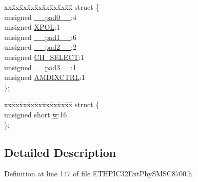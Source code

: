 \begin{DoxyCompactItemize}
\begin{tabbing}
\end{tabbing}\item 
\begin{tabbing}
xx\=xx\=xx\=xx\=xx\=xx\=xx\=xx\=xx\=\kill
struct \{\\
\>unsigned \hyperlink{union_____s_p_e_c_i_a_l_c_t_r_lbits__t_adf71f3d8410c1f1dbbc96680a92c49af}{\_\_pad0\_\_}:4\\
\>unsigned \hyperlink{union_____s_p_e_c_i_a_l_c_t_r_lbits__t_a95295a55abaebd3cb654ddc970a85c7a}{XPOL}:1\\
\>unsigned \hyperlink{union_____s_p_e_c_i_a_l_c_t_r_lbits__t_acaf2d0924a107ec6e8d2e31febaf66f9}{\_\_pad1\_\_}:6\\
\>unsigned \hyperlink{union_____s_p_e_c_i_a_l_c_t_r_lbits__t_a4d97cc5f7d51d22fc2bf3eab35c9cb7f}{\_\_pad2\_\_}:2\\
\>unsigned \hyperlink{union_____s_p_e_c_i_a_l_c_t_r_lbits__t_a240937d212a5abcad1c8f2bce615a143}{CH\_SELECT}:1\\
\>unsigned \hyperlink{union_____s_p_e_c_i_a_l_c_t_r_lbits__t_ad7d7cee33e0c7f447abc4d171c628dd4}{\_\_pad3\_\_}:1\\
\>unsigned \hyperlink{union_____s_p_e_c_i_a_l_c_t_r_lbits__t_aa074bf8630cee4a7c8ebb420b5350f1b}{AMDIXCTRL}:1\\
\}; \\

\end{tabbing}\item 
\begin{tabbing}
xx\=xx\=xx\=xx\=xx\=xx\=xx\=xx\=xx\=\kill
struct \{\\
\>unsigned short \hyperlink{union_____s_p_e_c_i_a_l_c_t_r_lbits__t_a160850a4684a3e82c2323033964f2e98}{w}:16\\
\}; \\

\end{tabbing}\end{DoxyCompactItemize}


\subsection{Detailed Description}


Definition at line 147 of file E\+T\+H\+P\+I\+C32\+Ext\+Phy\+S\+M\+S\+C8700.\+h.




